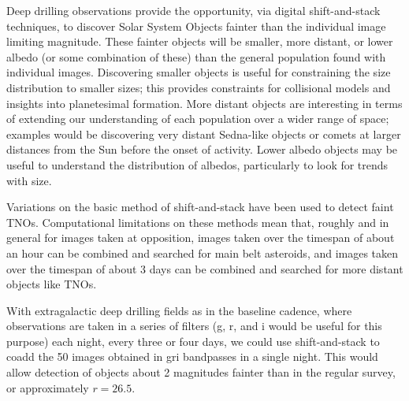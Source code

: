 Deep drilling observations provide the opportunity, via digital
shift-and-stack techniques, to discover Solar System Objects fainter
than the individual image limiting magnitude. These fainter objects
will be smaller, more distant, or lower albedo (or some combination of these)
than the general population found with individual images. Discovering smaller
objects is useful for constraining the size distribution to smaller
sizes; this provides constraints for collisional models and insights
into planetesimal formation. More distant objects are interesting in
terms of extending our understanding of each population over a wider
range of space; examples would be discovering very distant
Sedna-like objects or comets at larger distances from the Sun before
the onset of activity. Lower albedo objects may be useful to
understand the distribution of albedos, particularly to look for
trends with size.

Variations on the basic method of shift-and-stack have been used to
detect faint TNOs.
Computational limitations on these methods mean that, roughly and in
general for images taken at opposition, images taken over the timespan
of about an hour can be combined and searched for main belt asteroids,
and images taken over the timespan of about 3 days can be combined and
searched for more distant objects like TNOs.

With extragalactic deep drilling fields as in the baseline cadence,
where observations are taken in a series of filters (g, r, and i
would be useful for this purpose) each night, every three or four
days, we could use shift-and-stack to coadd the 50 images obtained in
gri bandpasses in a single night. This would allow detection of
objects about 2 magnitudes fainter than in the regular survey, or
approximately $r=26.5$.
%
%


\navigationbar
